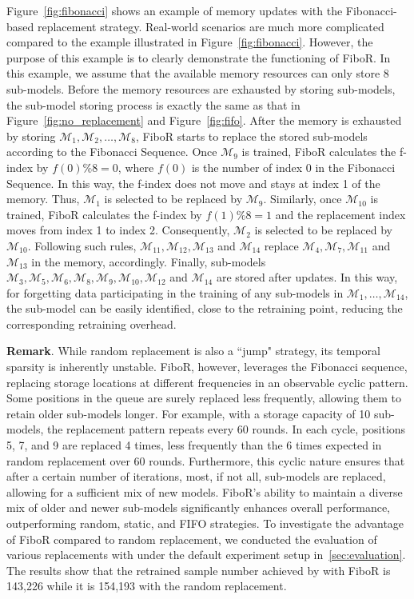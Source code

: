 \documentclass[conference,compsoc]{IEEEtran}
\begin{document}
Figure~\ref{fig:fibonacci} shows an example of memory updates with the Fibonacci-based replacement strategy. Real-world scenarios are much more complicated compared to the example illustrated in Figure~\ref{fig:fibonacci}. However, the purpose of this example is to clearly demonstrate the functioning of FiboR. In this example, we assume that the available memory resources can only store 8 sub-models. Before the memory resources are exhausted by storing sub-models, the sub-model storing process is exactly the same as that in Figure~\ref{fig:no_replacement} and Figure~\ref{fig:fifo}. After the memory is exhausted by storing $\mathcal{M}_1, \mathcal{M}_2, \dots, \mathcal{M}_8$, FiboR starts to replace the stored sub-models according to the Fibonacci Sequence. Once $\mathcal{M}_9$ is trained, FiboR calculates the f-index by $f(0)\%8 = 0$, where $f(0)$ is the number of index 0 in the Fibonacci Sequence. In this way, the f-index does not move and stays at index 1 of the memory. Thus, $\mathcal{M}_1$ is selected to be replaced by $\mathcal{M}_9$. Similarly, once $\mathcal{M}_{10}$ is trained, FiboR calculates the f-index by $f(1)\%8 = 1$ and the replacement index moves from index 1 to index 2. Consequently, $\mathcal{M}_2$ is selected to be replaced by $\mathcal{M}_{10}$. Following such rules, $\mathcal{M}_{11}, \mathcal{M}_{12}, \mathcal{M}_{13}$ and $\mathcal{M}_{14}$ replace $\mathcal{M}_4, \mathcal{M}_7, \mathcal{M}_{11}$ and $\mathcal{M}_{13}$ in the memory, accordingly. Finally, sub-models $\mathcal{M}_3, \mathcal{M}_5, \mathcal{M}_6, \mathcal{M}_8, \mathcal{M}_9, \mathcal{M}_{10}, \mathcal{M}_{12}$ and $\mathcal{M}_{14}$ are stored after updates. In this way, for forgetting data participating in the training of any sub-models in $\mathcal{M}_1, \dots, \mathcal{M}_{14}$, the sub-model can be easily identified, close to the retraining point, reducing the corresponding retraining overhead.


\noindent\textbf{Remark}. While random replacement is also a ``jump" strategy, its temporal sparsity is inherently unstable. FiboR, however, leverages the Fibonacci sequence, replacing storage locations at different frequencies in an observable cyclic pattern. Some positions in the queue are surely replaced less frequently, allowing them to retain older sub-models longer. For example, with a storage capacity of 10 sub-models, the replacement pattern repeats every 60 rounds. In each cycle, positions 5, 7, and 9 are replaced 4 times, less frequently than the 6 times expected in random replacement over 60 rounds. Furthermore, this cyclic nature ensures that after a certain number of iterations, most, if not all, sub-models are replaced, allowing for a sufficient mix of new models. 
FiboR's ability to maintain a diverse mix of older and newer sub-models significantly enhances overall performance, outperforming random, static, and FIFO strategies. To investigate the advantage of FiboR compared to random replacement, we conducted the evaluation of various replacements with \tool under the default experiment setup in~\cref{sec:evaluation}. The results show that the retrained sample number achieved by \tool with FiboR is 143,226 while it is 154,193 with the random replacement. 
\end{document}

